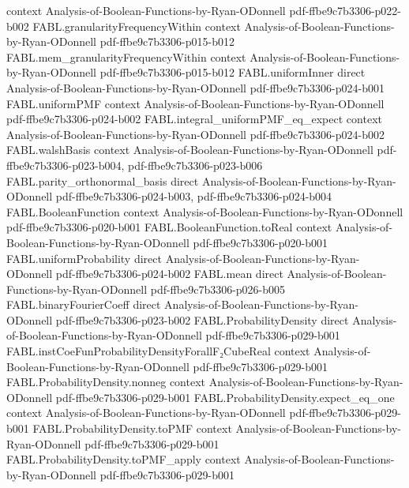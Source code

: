\begin{theorem}
  {context}
  {Analysis-of-Boolean-Functions-by-Ryan-ODonnell}
  {pdf-ffbe9c7b3306-p022-b002}
\proofstep
  {FABL.granularityFrequencyWithin}
  {context}
  {Analysis-of-Boolean-Functions-by-Ryan-ODonnell}
  {pdf-ffbe9c7b3306-p015-b012}
\proofstep
  {FABL.mem_granularityFrequencyWithin}
  {context}
  {Analysis-of-Boolean-Functions-by-Ryan-ODonnell}
  {pdf-ffbe9c7b3306-p015-b012}
\proofstep
  {FABL.uniformInner}
  {direct}
  {Analysis-of-Boolean-Functions-by-Ryan-ODonnell}
  {pdf-ffbe9c7b3306-p024-b001}
\proofstep
  {FABL.uniformPMF}
  {context}
  {Analysis-of-Boolean-Functions-by-Ryan-ODonnell}
  {pdf-ffbe9c7b3306-p024-b002}
\proofstep
  {FABL.integral_uniformPMF_eq_expect}
  {context}
  {Analysis-of-Boolean-Functions-by-Ryan-ODonnell}
  {pdf-ffbe9c7b3306-p024-b002}
\proofstep
  {FABL.walshBasis}
  {context}
  {Analysis-of-Boolean-Functions-by-Ryan-ODonnell}
  {pdf-ffbe9c7b3306-p023-b004,
    pdf-ffbe9c7b3306-p023-b006}
\proofstep
  {FABL.parity_orthonormal_basis}
  {direct}
  {Analysis-of-Boolean-Functions-by-Ryan-ODonnell}
  {pdf-ffbe9c7b3306-p024-b003,
    pdf-ffbe9c7b3306-p024-b004}
\proofstep
  {FABL.BooleanFunction}
  {context}
  {Analysis-of-Boolean-Functions-by-Ryan-ODonnell}
  {pdf-ffbe9c7b3306-p020-b001}
\proofstep
  {FABL.BooleanFunction.toReal}
  {context}
  {Analysis-of-Boolean-Functions-by-Ryan-ODonnell}
  {pdf-ffbe9c7b3306-p020-b001}
\proofstep
  {FABL.uniformProbability}
  {direct}
  {Analysis-of-Boolean-Functions-by-Ryan-ODonnell}
  {pdf-ffbe9c7b3306-p024-b002}
\proofstep
  {FABL.mean}
  {direct}
  {Analysis-of-Boolean-Functions-by-Ryan-ODonnell}
  {pdf-ffbe9c7b3306-p026-b005}
\proofstep
  {FABL.binaryFourierCoeff}
  {direct}
  {Analysis-of-Boolean-Functions-by-Ryan-ODonnell}
  {pdf-ffbe9c7b3306-p023-b002}
\proofstep
  {FABL.ProbabilityDensity}
  {direct}
  {Analysis-of-Boolean-Functions-by-Ryan-ODonnell}
  {pdf-ffbe9c7b3306-p029-b001}
\proofstep
  {FABL.instCoeFunProbabilityDensityForallF₂CubeReal}
  {context}
  {Analysis-of-Boolean-Functions-by-Ryan-ODonnell}
  {pdf-ffbe9c7b3306-p029-b001}
\proofstep
  {FABL.ProbabilityDensity.nonneg}
  {context}
  {Analysis-of-Boolean-Functions-by-Ryan-ODonnell}
  {pdf-ffbe9c7b3306-p029-b001}
\proofstep
  {FABL.ProbabilityDensity.expect_eq_one}
  {context}
  {Analysis-of-Boolean-Functions-by-Ryan-ODonnell}
  {pdf-ffbe9c7b3306-p029-b001}
\proofstep
  {FABL.ProbabilityDensity.toPMF}
  {context}
  {Analysis-of-Boolean-Functions-by-Ryan-ODonnell}
  {pdf-ffbe9c7b3306-p029-b001}
\proofstep
  {FABL.ProbabilityDensity.toPMF_apply}
  {context}
  {Analysis-of-Boolean-Functions-by-Ryan-ODonnell}
  {pdf-ffbe9c7b3306-p029-b001}

\end{theorem}
